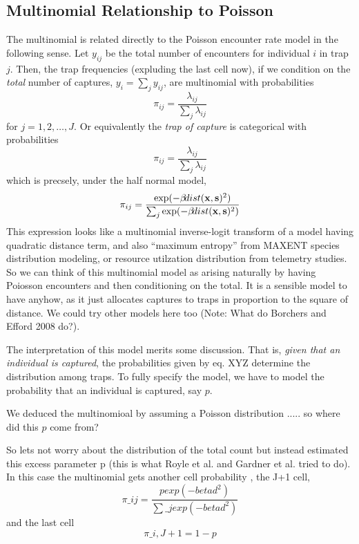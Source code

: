 {\subsection{Multinomial Relationship to Poisson}

The multinomial is related
directly to the Poisson encounter rate model in the 
following sense. Let $y_{ij}$ be the total number of encounters for
individual $i$ in trap $j$. Then, 
the trap frequencies (expluding the
last cell now),
if we condition on the {\it total}
number of captures, $y_{i} = \sum_{j} y_{ij}$, 
are multinomial with probabilities 
\[
 \pi_{ij} =  \frac{ \lambda_{ij} } { \sum_{j} \lambda_{ij} } 
\]
for $j=1,2,\ldots,J$.
Or equivalently the {\it trap of
  capture} is categorical with probabilities
\[
 \pi_{ij} =  \frac{ \lambda_{ij} } { \sum_{j} \lambda_{ij} } 
\]
which is precsely, under the half normal model, 
\[
 \pi_{ij} =  \frac{ \exp( - \beta \! dist({\bf x},{\bf s})^2 ) }  {
   \sum_{j} \exp(-\beta \! dist({\bf x},{\bf s})^2)}
\]
This expression looks like a multinomial inverse-logit transform of a model having
quadratic distance term, and also ``maximum entropy'' from MAXENT
species distribution modeling, or resource utilzation distribution
from telemetry studies.
So we can think of this multinomial model as arising naturally 
by having Poiosson encounters and then conditioning on the total. 
It is a sensible model to have anyhow, as it just allocates captures
to traps in proportion to the square of distance.  We could try other
models here too (Note: What do Borchers and Efford 2008 do?).


The interpretation of this model merits some discussion. That is, 
{\it given that an individual is captured}, the probabilities given by
eq. XYZ determine 
the distribution among traps. To fully specify the model, we have to
model the probability that an individual is captured, say $p$.

We deduced the multinomioal by assuming a Poisson distribution
..... so
where did this $p$ come from?

So lets not worry about the distribution of the total count
but instead estimated this excess parameter p (this is what Royle et al.
and Gardner et al. tried to do).  In this case the multinomial gets
another cell probability , the J+1 cell, 
\[
 \pi\_{ij} =  \frac{ p exp( - beta d^2 ) }  { \sum\_{j} exp(-beta d^2)}
\]
and the last cell
\[
 \pi\_{i,J+1} =  1-p 
\]


}
